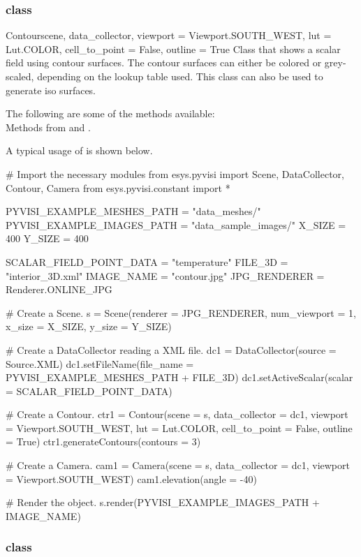\subsubsection{\Contour class}

\begin{classdesc}{Contour}{scene, data_collector, 
viewport = Viewport.SOUTH_WEST, lut = Lut.COLOR, cell_to_point = False, 
outline = True}
Class that shows a scalar field using contour surfaces. The contour surfaces can
either be colored or grey-scaled, depending on the lookup table used. This
class can also be used to generate iso surfaces.
\end{classdesc}

The following are some of the methods available:\\
Methods from \ActorThreeD and \ContourModule. 

A typical usage of \Contour is shown below.

\begin{python}
# Import the necessary modules
from esys.pyvisi import Scene, DataCollector, Contour, Camera
from esys.pyvisi.constant import *

PYVISI_EXAMPLE_MESHES_PATH = "data_meshes/"
PYVISI_EXAMPLE_IMAGES_PATH = "data_sample_images/"
X_SIZE = 400
Y_SIZE = 400

SCALAR_FIELD_POINT_DATA = "temperature"
FILE_3D = "interior_3D.xml"
IMAGE_NAME = "contour.jpg"
JPG_RENDERER = Renderer.ONLINE_JPG


# Create a Scene.
s = Scene(renderer = JPG_RENDERER, num_viewport = 1, x_size = X_SIZE, 
        y_size = Y_SIZE)

# Create a DataCollector reading a XML file.
dc1 = DataCollector(source = Source.XML)
dc1.setFileName(file_name = PYVISI_EXAMPLE_MESHES_PATH + FILE_3D)
dc1.setActiveScalar(scalar = SCALAR_FIELD_POINT_DATA)

# Create a Contour.
ctr1 = Contour(scene = s, data_collector = dc1, viewport = Viewport.SOUTH_WEST,
        lut = Lut.COLOR, cell_to_point = False, outline = True)
ctr1.generateContours(contours = 3)

# Create a Camera.
cam1 = Camera(scene = s, data_collector = dc1, viewport = Viewport.SOUTH_WEST)
cam1.elevation(angle = -40)

# Render the object.
s.render(PYVISI_EXAMPLE_IMAGES_PATH + IMAGE_NAME)
\end{python}

\subsubsection{\ContourOnPlaneCut class}

